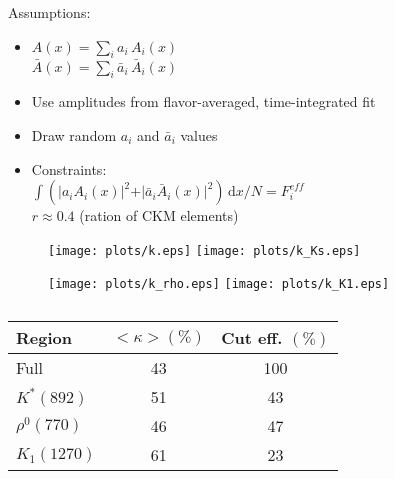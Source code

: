 Assumptions:
	\begin{itemize}
		\item   $A(x) = \sum_i a_i \, A_i(x)$   \\
		 $\bar A(x) = \sum_i \bar a_i \, \bar A_i(x)$
		\item Use amplitudes from flavor-averaged, time-integrated fit
		 \item Draw random $a_i$ and $\bar a_i $ values
		 \item Constraints: \\
		 $\int ( \vert a_i  A_i(x) \vert^2 + \vert \bar a_i  \bar A_i(x) \vert^2 ) \, \text{d}x / N = F^{eff}_i $ \\
		 $r \approx 0.4 $ (ration of CKM elements)
	\end{itemize}
	
\begin{figure}[hp]
	\centering
		\texttt{[image: plots/k.eps]} 
		\texttt{[image: plots/k\_Ks.eps]} 
		
		\texttt{[image: plots/k\_rho.eps]} 
		\texttt{[image: plots/k\_K1.eps]} 	
		\caption{}	
\end{figure}		

	\begin{table}[h]
			\caption{}	
  \footnotesize
  \centering
  \begin{tabular}
    {l c c }
    \hline \hline
    Region &  $<\kappa> (\%)$   &  Cut eff. $(\%)$ \\   \hline
    Full & 43 &  100 \\
    $K^*(892)$ & 51    &  43  \\
    $\rho^0(770)$ & 46  & 47   \\
    $K_1(1270)$ & 61   & 23  \\
    \hline \hline
  \end{tabular}
  \label{tab:sideband}
\end{table}


